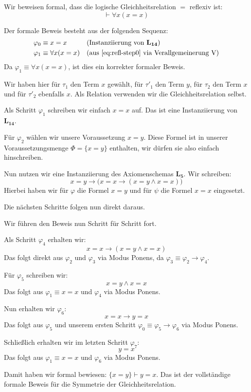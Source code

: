 \begin{math-stroke}
Wir beweisen formal, dass die logische Gleichheitsrelation $=$ reflexiv ist:
\[ \vdash \forall x (x = x) \]

\begin{short-proof}
Der formale Beweis besteht aus der folgenden Sequenz:
\begin{align}
\varphi_0 &\equiv x = x && \text{(Instanziierung von $\mathbf{L_{14}}$)} \label{eq:refl-step0} \\
\varphi_1 &\equiv \forall x (x = x) && \text{(aus \ref{eq:refl-step0} via Verallgemeinerung $\text{V}$)} \label{eq:refl-step1}
\end{align}
Da $\varphi_1 \equiv \forall x (x = x)$, ist dies ein korrekter formaler Beweis.
\end{short-proof}
\end{math-stroke}

\begin{spoken-clean}[00:57:34 - 00:59:34]
Wir haben hier für $\tau_1$ den Term $x$ gewählt, für $\tau'_1$ den Term $y$, für $\tau_2$ den Term $x$ und für $\tau'_2$ ebenfalls $x$. Als Relation verwenden wir die Gleichheitsrelation selbst. 

Als Schritt $\varphi_1$ schreiben wir einfach $x = x$ auf. Das ist eine Instanziierung von $\mathbf{L_{14}}$. 

Für $\varphi_2$ wählen wir unsere Voraussetzung $x = y$. Diese Formel ist in unserer Voraussetzungsmenge $\Phi = \{x = y\}$ enthalten, wir dürfen sie also einfach hinschreiben. 

Nun nutzen wir eine Instanziierung des Axiomenschemas $\mathbf{L_5}$. Wir schreiben:
\[ x = y \rightarrow \bigl(x = x \rightarrow (x = y \wedge x = x)\bigr) \]
Hierbei haben wir für $\varphi$ die Formel $x = y$ und für $\psi$ die Formel $x = x$ eingesetzt. 

Die nächsten Schritte folgen nun direkt daraus.
\end{spoken-clean}

\begin{spoken-clean}[00:59:34 - 01:01:12]
Wir führen den Beweis nun Schritt für Schritt fort. 

Als Schritt $\varphi_4$ erhalten wir:
\[ x = x \rightarrow (x = y \wedge x = x) \]
Das folgt direkt aus $\varphi_2$ und $\varphi_3$ via Modus Ponens, da $\varphi_3 \equiv \varphi_2 \rightarrow \varphi_4$. 

Für $\varphi_5$ schreiben wir:
\[ x = y \wedge x = x \]
Das folgt aus $\varphi_1 \equiv x = x$ und $\varphi_4$ via Modus Ponens. 

Nun erhalten wir $\varphi_6$:
\[ x = x \rightarrow y = x \]
Das folgt aus $\varphi_5$ und unserem ersten Schritt $\varphi_0 \equiv \varphi_5 \rightarrow \varphi_6$ via Modus Ponens. 

Schließlich erhalten wir im letzten Schritt $\varphi_7$:
\[ y = x \]
Das folgt aus $\varphi_1 \equiv x = x$ und $\varphi_6$ via Modus Ponens. 

Damit haben wir formal bewiesen: $\{x = y\} \vdash y = x$. Das ist der vollständige formale Beweis für die Symmetrie der Gleichheitsrelation.
\end{spoken-clean}

